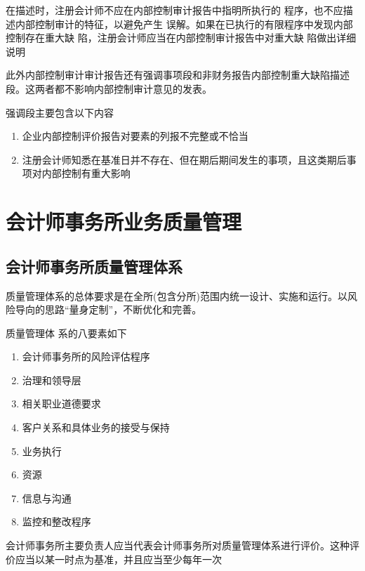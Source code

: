 \documentclass[UTF8,12pt]{ctexart}
\numberwithin{equation}{section} %
\numberwithin{figure}{section}
\numberwithin{table}{section}
\begin{document}
	在描述时，注册会计师不应在内部控制审计报告中指明所执行的 程序，也不应描述内部控制审计的特征，以避免产生 误解。如果在已执行的有限程序中发现内部控制存在重大缺 陷，注册会计师应当在内部控制审计报告中对重大缺 陷做出详细说明
	
	此外内部控制审计审计报告还有强调事项段和非财务报告内部控制重大缺陷描述段。这两者都不影响内部控制审计意见的发表。
	
	强调段主要包含以下内容
	\begin{enumerate}
		\item 企业内部控制评价报告对要素的列报不完整或不恰当
		
		\item 注册会计师知悉在基准日并不存在、但在期后期间发生的事项，且这类期后事项对内部控制有重大影响
	\end{enumerate}
	
	\newpage
	\section{会计师事务所业务质量管理}
	
	\subsection{会计师事务所质量管理体系}
	质量管理体系的总体要求是在全所(包含分所)范围内统一设计、实施和运行。以风险导向的思路“量身定制”，不断优化和完善。
	
	质量管理体 系的八要素如下
	\begin{enumerate}
		\item 会计师事务所的风险评估程序
		
		\item 治理和领导层
		
		\item 相关职业道德要求
		
		\item 客户关系和具体业务的接受与保持
		
		\item 业务执行
		
		\item 资源
		
		\item 信息与沟通
		
		\item 监控和整改程序
	\end{enumerate}
	
	会计师事务所主要负责人应当代表会计师事务所对质量管理体系进行评价。这种评价应当以某一时点为基准，并且应当至少每年一次
	
\end{document}
